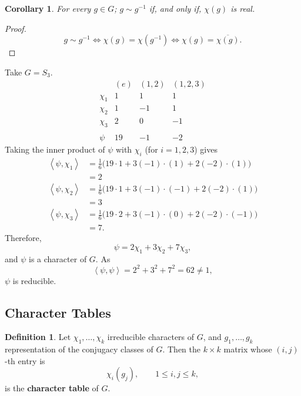 \documentclass[11pt, notitlepage]{article}
\numberwithin{equation}{section}
\theoremstyle{plain}
\newtheorem{corollary}{Corollary}[theorem]
\theoremstyle{definition}
\newtheorem{definition}[theorem]{Definition}
\newenvironment{example}
	{\pushQED{\qed}\renewcommand{\qedsymbol}{$\blacktriangleleft$}\examplex}
	{\popQED\endexamplex}
\newcommand{\inner}[2]{\left\langle #1,#2 \right\rangle}
\begin{document}
\begin{corollary}
For every $g \in G$; $g \sim g^{-1}$ if, and only if, $\chi(g)$ is real.
\end{corollary}

\begin{proof}
\[
    g \sim g^{-1} \iff \chi(g) = \chi(g^{-1}) \iff \chi(g) = \overline{\chi(g)}.
\]
\end{proof}

\begin{example}
Take $G = S_3$.
\[
    \begin{array}{c|rrr}
               & (e) & (1,2) & (1,2,3) \\\hline
        \chi_1 &  1  &   1   &    1    \\
        \chi_2 &  1  &  -1   &    1    \\
        \chi_3 &  2  &   0   &   -1    \\
               &     &       &         \\
        \psi   &  19 &  -1   &   -2
    \end{array}
\]
Taking the inner product of $\psi$ with $\chi_i$ (for $i=1,2,3$) gives
\begin{align*}
    \inner{\psi}{\chi_1} &= \frac{1}{6}\big(19 \cdot 1 + 3(-1)\cdot (1) + 2(-2) \cdot (1)\big)\\
    &= 2\\
    \inner{\psi}{\chi_2} &= \frac{1}{6}\big(19 \cdot 1 + 3(-1)\cdot (-1) + 2(-2) \cdot (1)\big)\\
    &= 3\\
    \inner{\psi}{\chi_3} &= \frac{1}{6}\big(19 \cdot 2 + 3(-1)\cdot (0) + 2(-2) \cdot (-1)\big)\\
    &= 7.
\end{align*}
Therefore,
\[
    \psi = 2\chi_1 + 3 \chi_2 + 7\chi_3,
\]
and $\psi$ is a character of $G$. As
\[
    \inner{\psi}{\psi} = 2^2 + 3^2 + 7^2 = 62 \neq 1,
\]
$\psi$ is reducible.
\end{example}


\subsection{Character Tables}


\begin{definition}
Let $\chi_1,\dots,\chi_k$ irreducible characters of $G$, and $g_1,\dots,g_k$ representation of the conjugacy classes of $G$. Then the $k \times k$ matrix whose $(i,j)$-th entry is
\[
    \chi_i(g_j), \qquad 1 \le i,j \le k,
\]
is the \textbf{character table} of $G$.
\end{definition}
\end{document}
